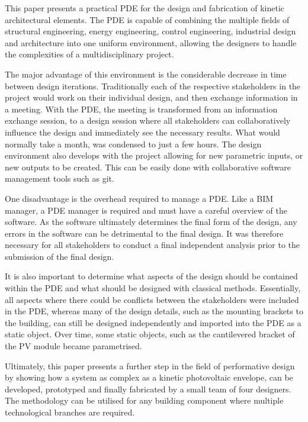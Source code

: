 
This paper presents a practical PDE for the design and fabrication of kinetic architectural elements. The PDE is capable of combining the multiple fields of structural engineering, energy engineering, control engineering, industrial design and architecture into one uniform environment, allowing the designers to handle the complexities of a multidisciplinary project. 

The major advantage of this environment is the considerable decrease in time between design iterations. Traditionally each of the respective stakeholders in the project would work on their individual design, and then exchange information in a meeting. With the PDE, the meeting is transformed from an information exchange session, to a design session where all stakeholders can collaboratively influence the design and immediately see the necessary results. What would normally take a month, was condensed to just a few hours. The design environment also develops with the project allowing for new parametric inputs, or new outputs to be created. This can be easily done with collaborative software management tools such as git.

One disadvantage is the overhead required to manage a PDE. Like a BIM manager, a PDE manager is required and must have a careful overview of the software. As the software ultimately determines the final form of the design, any errors in the software can be detrimental to the final design. It was therefore necessary for all stakeholders to conduct a final independent analysis prior to the submission of the final design. 

It is also important to determine what aspects of the design should be contained within the PDE and what should be designed with classical methods. Essentially, all aspects where there could be conflicts between the stakeholders were included in the PDE, whereas many of the design details, such as the mounting brackets to the building, can still be designed independently and imported into the PDE as a static object. Over time, some static objects, such as the cantilevered bracket of the PV module became parametrised. 

Ultimately, this paper presents a further step in the field of performative design by showing how a system as complex as a kinetic photovoltaic envelope, can be developed, prototyped and finally fabricated by a small team of four designers. The methodology can be utilised for any building component where multiple technological branches are required.

